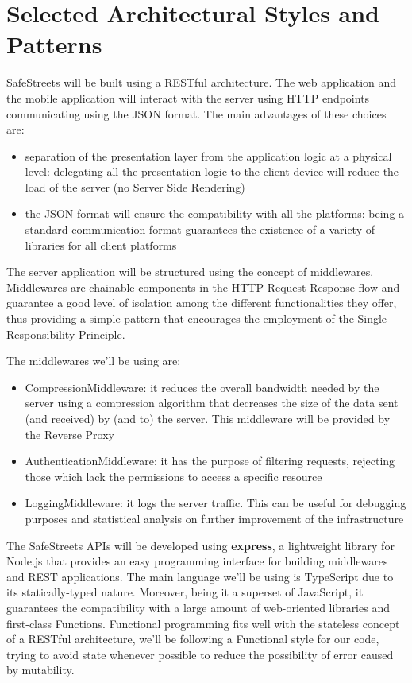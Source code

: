 \section{Selected Architectural Styles and Patterns}

SafeStreets will be built using a RESTful architecture. The web application and the mobile application will interact with the server using
HTTP endpoints communicating using the JSON format.
The main advantages of these choices are:
\begin{itemize}
  \item separation of the presentation layer from the application logic at a physical level: delegating
  all the presentation logic to the client device will reduce the load of the server (no Server Side Rendering)
  \item the JSON format will ensure the compatibility with all the platforms: being a standard communication format
  guarantees the existence of a variety of libraries for all client platforms
\end{itemize}

The server application will be structured using the concept of middlewares.
Middlewares are chainable components in the HTTP Request-Response flow and guarantee a good
level of isolation among the different functionalities they offer, thus providing a simple pattern that
encourages the employment of the Single Responsibility Principle.

The middlewares we'll be using are:
\begin{itemize}
  \item CompressionMiddleware: it reduces the overall bandwidth needed by the server using a compression algorithm that decreases the size of the data sent (and received) by (and to) the server.
  This middleware will be provided by the Reverse Proxy
  \item AuthenticationMiddleware: it has the purpose of filtering requests, rejecting those which lack the permissions to access a specific resource
  \item LoggingMiddleware: it logs the server traffic. This can be useful for debugging purposes and statistical analysis on further improvement of the infrastructure
\end{itemize}

The SafeStreets APIs will be developed using \textbf{express}, a lightweight library for Node.js that provides an easy
programming interface for building middlewares and REST applications.
The main language we'll be using is TypeScript due to its statically-typed nature. Moreover, being it a superset of JavaScript,
it guarantees the compatibility with a large amount of web-oriented libraries and first-class Functions.
Functional programming fits well with the stateless concept of a RESTful architecture, we'll be following a Functional style for our code,
trying to avoid state whenever possible to reduce the possibility of error caused by mutability.

